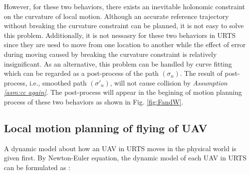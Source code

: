 \documentclass[journal,12pt,onecolumn,draftclsnofoot,]{IEEEtran}
\begin{document}
However, for these two behaviors, there exists an inevitable holonomic constraint on the curvature of local motion. Although an accurate reference trajectory without breaking the curvature constraint can be planned, it is not easy to solve this problem. Additionally, it is not nessasry for these two behaviors in URTS since they are uesd to move from one location to another while the effect of error during moving caused by breaking the curvature constraint is relatively insignificant. As an alternative, this problem can be handled by curve fitting which can be regarded as a post-process of the path $(\sigma_n)$. The result of post-process, i.e., smoothed path $(\sigma'_n)$, will not cause collision by \textit{Assumption \ref{asm:cc again}}. The post-process will appear in the begining of motion planning process of these two behaviors as shown in Fig. \ref{fig:FandW}. 

\subsection{Local motion planning of flying of UAV}
A dynamic model about how an UAV in URTS moves in the physical world is given first. By Newton-Euler equation, the dynamic model of each UAV in URTS can be formulated as \cite{sabatino2015quadrotor}:
\end{document}
